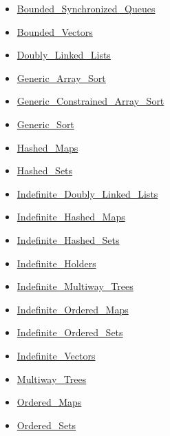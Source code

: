 \documentclass[english]{article}
\begin{document}
\begin{scriptsize}
\begin{multicols*}{5}
\begin{itemize}[leftmargin=0mm]
\begin{itemize}[leftmargin=5mm]
\begin{itemize}[leftmargin=5mm]
	\item[] \href{http://www.ada-auth.org/standards/22rm/html/RM-A-18-29.html}{Bounded\_Synchronized\_Queues}
	\item[] \href{http://www.ada-auth.org/standards/22rm/html/RM-A-18-19.html}{Bounded\_Vectors}
	\item[] \href{http://www.ada-auth.org/standards/22rm/html/RM-A-18-3.html}{Doubly\_Linked\_Lists}
	\item[] \href{http://www.ada-auth.org/standards/22rm/html/RM-A-18-26.html}{Generic\_Array\_Sort}
	\item[] \href{http://www.ada-auth.org/standards/22rm/html/RM-A-18-26.html}{Generic\_Constrained\_Array\_Sort}
	\item[] \href{http://www.ada-auth.org/standards/22rm/html/RM-A-18-26.html}{Generic\_Sort}
	\item[] \href{http://www.ada-auth.org/standards/22rm/html/RM-A-18-5.html}{Hashed\_Maps}
	\item[] \href{http://www.ada-auth.org/standards/22rm/html/RM-A-18-8.html}{Hashed\_Sets}
	\item[] \href{http://www.ada-auth.org/standards/22rm/html/RM-A-18-12.html}{Indefinite\_Doubly\_Linked\_Lists}
	\item[] \href{http://www.ada-auth.org/standards/22rm/html/RM-A-18-13.html}{Indefinite\_Hashed\_Maps}
	\item[] \href{http://www.ada-auth.org/standards/22rm/html/RM-A-18-15.html}{Indefinite\_Hashed\_Sets}
	\item[] \href{http://www.ada-auth.org/standards/22rm/html/RM-A-18-18.html}{Indefinite\_Holders}
	\item[] \href{http://www.ada-auth.org/standards/22rm/html/RM-A-18-17.html}{Indefinite\_Multiway\_Trees}
	\item[] \href{http://www.ada-auth.org/standards/22rm/html/RM-A-18-14.html}{Indefinite\_Ordered\_Maps}
	\item[] \href{http://www.ada-auth.org/standards/22rm/html/RM-A-18-16.html}{Indefinite\_Ordered\_Sets}
	\item[] \href{http://www.ada-auth.org/standards/22rm/html/RM-A-18-11.html}{Indefinite\_Vectors}
	\item[] \href{http://www.ada-auth.org/standards/22rm/html/RM-A-18-10.html}{Multiway\_Trees}
	\item[] \href{http://www.ada-auth.org/standards/22rm/html/RM-A-18-6.html}{Ordered\_Maps}
	\item[] \href{http://www.ada-auth.org/standards/22rm/html/RM-A-18-9.html}{Ordered\_Sets}

\end{itemize}
\end{itemize}
\end{itemize}
\end{multicols*}
\end{scriptsize}
\end{document}
